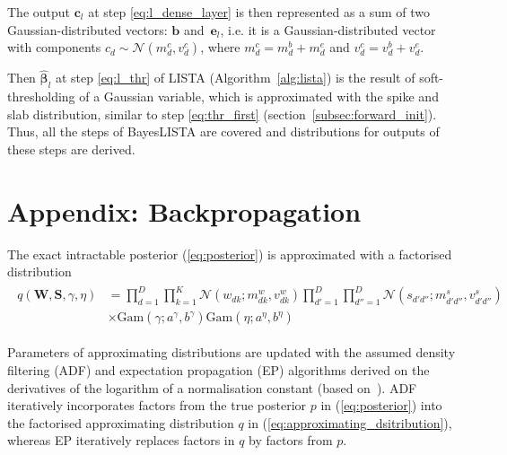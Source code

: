 \documentclass{article}
\begin{document}
  The output $\mathbf{c}_l$ at step \ref{eq:l_dense_layer} is then represented as a sum of two Gaussian-distributed vectors: $\mathbf{b}$ and~$\mathbf{e}_l$, i.e. it is a Gaussian-distributed vector with components $c_{d} \sim \mathcal{N}(m^c_{d}, v^c_{d})$, where $m^c_{d} = m^b_{d} + m^e_{d}$ and $v^c_{d} = v^b_{d} + v^e_{d}$.
  
  
  Then $\widehat{\boldsymbol\beta}_{l}$ at step \ref{eq:l_thr} of LISTA (Algorithm~\ref{alg:lista}) is the result of soft-thresholding of a Gaussian variable, which is approximated with the spike and slab distribution,  similar to step \ref{eq:thr_first} (section~\ref{subsec:forward_init}).
  Thus, all the steps of BayesLISTA are covered and distributions for outputs of these steps are derived.
  
  \section{Appendix: Backpropagation}
  \label{sec:backpropagation}
  
  The exact intractable posterior (\ref{eq:posterior}) is approximated with a factorised distribution
\begin{align}
\label{eq:approximating_dsitribution}
\begin{split}
q(\mathbf{W}, \mathbf{S}, \gamma, \eta) &= \prod_{d=1}^D\prod_{k=1}^K \mathcal{N}(w_{dk} ; m^w_{dk}, v^w_{dk}) \prod_{d'=1}^D\prod_{d''=1}^D \mathcal{N}(s_{d'd''} ; m^s_{d'd''}, v^s_{d'd''}) \\
&\times \text{Gam}(\gamma; a^\gamma, b^\gamma) \text{Gam}(\eta; a^\eta, b^\eta)
\end{split}
\end{align}
  
  Parameters of approximating distributions are updated with the assumed density filtering (ADF) and expectation propagation (EP) algorithms derived on the derivatives of the logarithm of a normalisation constant (based on~\cite{hernandez2015probabilistic}). ADF iteratively incorporates factors from the true posterior $p$ in (\ref{eq:posterior}) into the factorised approximating distribution $q$ in (\ref{eq:approximating_dsitribution}), whereas EP iteratively replaces factors in $q$ by factors from $p$.
  
\end{document}

